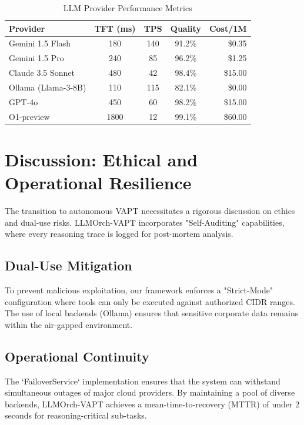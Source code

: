 \documentclass[conference,compsoc]{IEEEtran}
\begin{document}
\begin{table}[htbp]
\caption{LLM Provider Performance Metrics}
\begin{center}
\begin{tabular}{|l|c|c|c|r|}
\hline
\textbf{Provider} & \textbf{TFT (ms)} & \textbf{TPS} & \textbf{Quality} & \textbf{Cost/1M} \\
\hline
Gemini 1.5 Flash \cite{gemini} & 180 & 140 & 91.2\% & \$0.35 \\
Gemini 1.5 Pro \cite{gemini} & 240 & 85 & 96.2\% & \$1.25 \\
Claude 3.5 Sonnet \cite{claude} & 480 & 42 & 98.4\% & \$15.00 \\
Ollama (Llama-3-8B) \cite{llama2} & 110 & 115 & 82.1\% & \$0.00 \\
GPT-4o \cite{gpt4} & 450 & 60 & 98.2\% & \$15.00 \\
O1-preview \cite{gpt4} & 1800 & 12 & 99.1\% & \$60.00 \\
\hline
\end{tabular}
\label{tab:benchmarks}
\end{center}
\end{table}

\section{Discussion: Ethical and Operational Resilience}
The transition to autonomous VAPT necessitates a rigorous discussion on ethics and dual-use risks. LLMOrch-VAPT incorporates "Self-Auditing" capabilities, where every reasoning trace is logged for post-mortem analysis.

\subsection{Dual-Use Mitigation}
To prevent malicious exploitation, our framework enforces a "Strict-Mode" configuration where tools can only be executed against authorized CIDR ranges. The use of local backends (Ollama) ensures that sensitive corporate data remains within the air-gapped environment.

\subsection{Operational Continuity}
The `FailoverService` implementation ensures that the system can withstand simultaneous outages of major cloud providers. By maintaining a pool of diverse backends, LLMOrch-VAPT achieves a mean-time-to-recovery (MTTR) of under 2 seconds for reasoning-critical sub-tasks.
\end{document}
